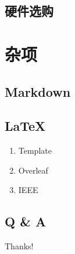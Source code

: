 \documentclass[a4paper]{article}
\begin{document}
\subsection{\LARGE 硬件选购}

\section{\LARGE 杂项}

\subsection{\LARGE Markdown}

\subsection{\LARGE LaTeX}

\begin{enumerate}[leftmargin=2cm, itemindent=1cm]
    \item Template
    \item Overleaf
    \item IEEE
\end{enumerate}

\subsection{\LARGE Q \& A}

\begin{center}
    {\Huge Thanks!}
\end{center}
\end{document}

